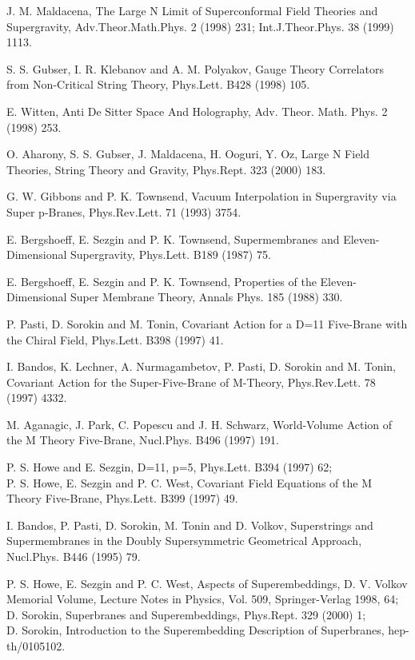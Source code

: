 \documentclass[a4paper,11pt]{article}
\begin{document}
\begin{thebibliography}{99}

J. M. Maldacena, The Large N Limit of Superconformal Field Theories and Supergravity,
Adv.Theor.Math.Phys. 2 (1998) 231; Int.J.Theor.Phys. 38 (1999) 1113.


S. S. Gubser, I. R. Klebanov and A. M. Polyakov,
Gauge Theory Correlators from Non-Critical String Theory,
Phys.Lett. B428 (1998) 105.

E. Witten, Anti De Sitter Space And Holography,
Adv. Theor. Math. Phys. 2 (1998) 253.


O. Aharony, S. S. Gubser, J. Maldacena, H. Ooguri, Y. Oz,
Large N Field Theories, String Theory and Gravity,
Phys.Rept. 323 (2000) 183.


G. W. Gibbons and P. K. Townsend,
Vacuum Interpolation in Supergravity via Super p-Branes,
Phys.Rev.Lett. 71 (1993) 3754.

E. Bergshoeff, E. Sezgin and P. K. Townsend,
Supermembranes and Eleven-Dimensional Supergravity,
Phys.Lett. B189 (1987) 75.

E. Bergshoeff, E. Sezgin and P. K. Townsend,
Properties of the Eleven-Dimensional Super Membrane Theory,
Annals Phys. 185 (1988) 330.



P. Pasti, D. Sorokin and M. Tonin,
Covariant Action for a D=11 Five-Brane with the Chiral Field,
Phys.Lett. B398 (1997) 41.



I. Bandos, K. Lechner, A. Nurmagambetov, P. Pasti, D. Sorokin and
M. Tonin, Covariant Action for the Super-Five-Brane of M-Theory,
Phys.Rev.Lett. 78 (1997) 4332.


M. Aganagic, J. Park, C. Popescu and J. H. Schwarz,
World-Volume Action of the M Theory Five-Brane, Nucl.Phys. B496 (1997) 191.

P. S. Howe and E. Sezgin, D=11, p=5, Phys.Lett. B394 (1997) 62;\\
P. S. Howe, E. Sezgin and P. C. West, Covariant Field Equations of
the M Theory Five-Brane, Phys.Lett. B399 (1997) 49.

I. Bandos, P. Pasti, D. Sorokin, M. Tonin and D. Volkov,
Superstrings and Supermembranes in the Doubly Supersymmetric Geometrical
Approach,
Nucl.Phys. B446 (1995) 79.

P. S. Howe, E. Sezgin and P. C. West, Aspects of Superembeddings,
D. V. Volkov Memorial Volume, Lecture Notes in Physics, Vol. 509,
Springer-Verlag 1998, 64;\\
D. Sorokin, Superbranes and Superembeddings, Phys.Rept. 329 (2000)
1;\\
D. Sorokin, Introduction to the Superembedding Description of
Superbranes, hep-th/0105102.



\end{thebibliography}
\end{document}
